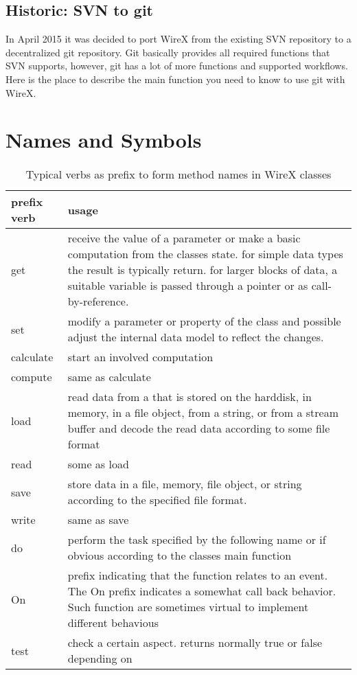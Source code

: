 \documentclass[11pt,a4paper,onepage,openany]{book}
\begin{document}
\subsection{Historic: SVN to git}
In April 2015 it was decided to port WireX from the existing SVN repository to
a decentralized git repository. Git basically provides all required functions
that SVN supports, however, git has a lot of more functions and supported
workflows. Here is the place to describe the main function you need to know to
use git with WireX.

\section{Names and Symbols}
\begin{table}[tbp]
\centering
\caption{Typical verbs as prefix to form method names in WireX
classes}\label{tab:PrefixVerbs}
\begin{tabular}{p{}p{}}
\hline
  prefix verb & usage \\
  \hline
  get & receive the value of a parameter or make a basic computation from the
  classes state. for simple data types the result is typically return. for
  larger blocks of data, a suitable variable is passed through a pointer or as
  call-by-reference.\\
  set & modify a parameter or property of the class and possible adjust the
  internal data model to reflect the changes.\\
  calculate & start an involved computation \\
  compute & same as calculate\\
  load & read data from a that is stored on the harddisk, in memory, in a file
  object, from a string, or from a stream buffer and decode the read data
  according to some file format\\
  read & some as load\\
  save & store data in a file, memory, file object, or string according to the
  specified file format.\\
  write & same as save\\
  do & perform the task specified by the following name or if obvious according
  to the classes main function\\
  On & prefix indicating that the function relates to an event. The On prefix
  indicates a somewhat call back behavior. Such function are sometimes virtual
  to implement different behavious\\
  test & check a certain aspect. returns normally true or false depending on

\end{tabular}
\end{table}
\end{document}
